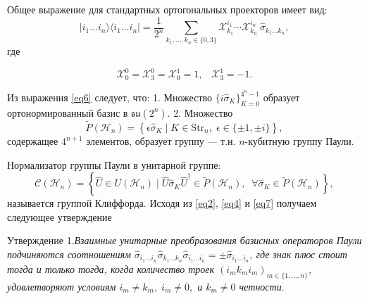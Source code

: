 \documentclass[a4paper]{report}
\begin{document}
Общее выражение для стандартных ортогональных проекторов имеет вид:
$$
|i_1\ldots i_n\rangle\langle i_1\ldots i_n| = \frac{1}{2^n} \sum_{k_1,\ldots,k_n \in \{0,3\}} \mathcal{X}^{i_1}_{k_1} \cdots \mathcal{X}^{i_n}_{k_n} \: \hat{\sigma}_{k_1\ldots k_n},
$$
\noindent где

$${
            \mathcal{X}^0_0=\mathcal{X}^0_3=\mathcal{X}^1_0=1,\;\;\;\mathcal{X}^1_3 = -1.
        }$$

Из выражения \eqref{eq6} следует, что:
1. Множество ${\{i\hat{\sigma}_K\}_{K=0}^{4^n-1}}$ образует ортонормированный базис в ${\mathfrak{su}(2^n)}$.
2. Множество
$${
    \widetilde{P}(\mathcal{H}_n) = \left\{\epsilon\hat{\sigma}_K \mid K \in \mathrm{Str}_n,\; \epsilon \in \{\pm1, \pm i\}\right\},
}$$
\noindent содержащее ${4^{n+1}}$ элементов, образует группу — т.н. ${n}$-кубитную группу Паули.

Нормализатор группы Паули в унитарной группе:
$${
    \mathcal{C}(\mathcal{H}_n) = \left\{\hat{U} \in U(\mathcal{H}_n) \mid \hat{U}\hat{\sigma}_K\hat{U}^\dagger \in \widetilde{P}(\mathcal{H}_n),\;\; \forall \hat{\sigma}_K \in \widetilde{P}(\mathcal{H}_n)\right\},
}$$
\noindent называется группой Клиффорда. Исходя из \eqref{eq2}, \eqref{eq4} и \eqref{eq7} получаем следующее утверждение

\textsf{Утверждение 1.}\textit{Взаимные унитарные преобразования базисных операторов Паули подчиняются соотношениям ${\hat{\sigma}_{i_1\ldots i_n}\hat{\sigma}_{k_1\ldots k_n}\hat{\sigma}_{i_1\ldots i_n}=\pm\hat{\sigma}_{i_1\ldots i_n}}$, где знак плюс стоит тогда и только тогда, когда количество троек ${(i_m k_m i_m)_{m\in\{1,\ldots,n\}}}$, удовлетворяют условиям ${i_m\neq k_m},\;i_m\neq0,$ и ${k_m\neq0}$ четности}.
\end{document}
